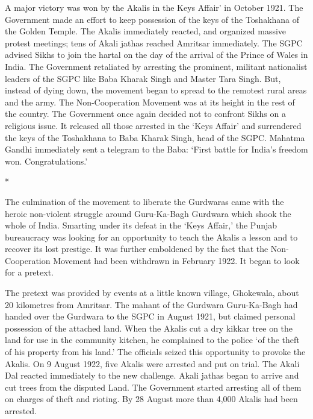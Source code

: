A major victory was won by the Akalis in the Keys Affair’ in October 1921. The Government made an effort to keep possession of the keys of the Toshakhana of the Golden Temple. The Akalis immediately reacted, and organized massive protest meetings; tens of Akali jathas reached Amritsar immediately. The SGPC advised Sikhs to join the hartal on the day of the arrival of the Prince of Wales in India. The Government retaliated by arresting the prominent, militant nationalist leaders of the SGPC like Baba Kharak Singh and Master Tara Singh. But, instead of dying down, the movement began to spread to the remotest rural areas and the army. The Non-Cooperation Movement was at its height in the rest of the country. The Government once again decided not to confront Sikhs on a religious issue. It released all those arrested in the ‘Keys Affair’ and surrendered the keys of the Toshakhana to Baba Kharak Singh, head of the SGPC. Mahatma Gandhi immediately sent a telegram to the Baba: ‘First battle for India’s freedom won. Congratulations.’

\begin{center}*\end{center}



The culmination of the movement to liberate the Gurdwaras came with the heroic non-violent struggle around Guru-Ka-Bagh Gurdwara which shook the whole of India. Smarting under its defeat in the ‘Keys Affair,’ the Punjab bureaucracy was looking for an opportunity to teach the Akalis a lesson and to recover its lost prestige. It was further emboldened by the fact that the Non- Cooperation Movement had been withdrawn in February 1922. It began to look for a pretext.

The pretext was provided by events at a little known village, Ghokewala, about 20 kilometres from Amritsar. The mahant of the Gurdwara Guru-Ka-Bagh had handed over the Gurdwara to the SGPC in August 1921, but claimed personal possession of the attached land. When the Akalis cut a dry kikkar tree on the land for use in the community kitchen, he complained to the police ‘of the theft of his property from his land.’ The officials seized this opportunity to provoke the Akalis. On 9 August 1922, five Akalis were arrested and put on trial. The Akali Dal reacted immediately to the new challenge. Akali jathas began to arrive and cut trees from the disputed Land. The Government started arresting all of them on charges of theft and rioting. By 28 August more than 4,000 Akalis had been arrested.

